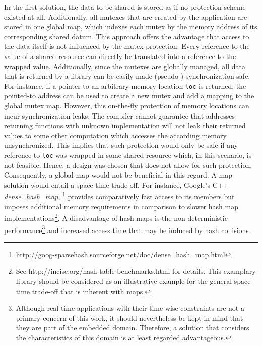 In the first solution, the data to be shared is stored as if no protection scheme existed at all. Additionally, all mutexes that are created by the application are stored in one global map, which indexes each mutex by the memory address of its corresponding shared datum. This approach offers the advantage that access to the data itself is not influenced by the mutex protection: Every reference to the value of a shared resource  can directly be translated into a reference to the wrapped value. Additionally, since the mutexes are globally managed, all data that is returned by a library can be easily made (pseudo-) synchronization safe. For instance, if a pointer to an arbitrary memory location \texttt{loc} is returned, the pointed-to address can be used to create a new mutex and add a mapping to the global mutex map. However, this on-the-fly protection of memory locations can incur synchronization leaks: The compiler cannot guarantee that addresses returning functions with unknown implementation will not leak their returned values to some other computation which accesses the according memory unsynchronized. This implies that such protection would only be safe if any reference to \texttt{loc} was wrapped in some shared resource which, in this scenario, is not feasible. Hence, a design was chosen that does not allow for such protection. Consequently, a global map would not be beneficial in this regard. A map solution would entail a space-time trade-off. For instance, Google's C++ \textit{dense\_hash\_map}, \footnote{http://goog-sparsehash.sourceforge.net/doc/dense\_hash\_map.html} provides comparatively fast access to its members but imposes additional memory requirements in comparison to slower hash map implementations\footnote{See http://incise.org/hash-table-benchmarks.html for details. This examplary library should be considered as an illustrative example for the general space-time trade-off that is inherent with maps.}. A disadvantage of hash maps is the non-deterministic performance\footnote{Although real-time applications with their time-wise constraints are not a primary concern of this work, it should nevertheless be kept in mind that they are part of the embedded domain. Therefore, a solution that considers the characteristics of this domain is at least regarded advantageous.} and increased access time that may be induced by hash collisions \cite{FastAndDeterministicHashTable}.

